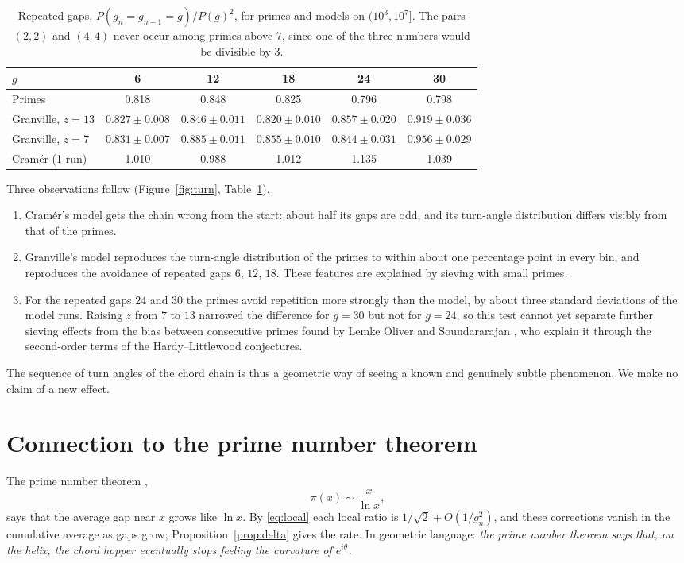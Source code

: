 \documentclass[11pt,a4paper]{article}
\theoremstyle{remark}
\theoremstyle{definition}
\begin{document}
\begin{table}[ht]
\centering
\small\setlength{\tabcolsep}{4pt}
\begin{tabular}{lccccc}
\toprule
$g$ & 6 & 12 & 18 & 24 & 30\\
\midrule
Primes & 0.818 & 0.848 & 0.825 & 0.796 & 0.798\\
Granville, $z=13$ & $0.827\pm0.008$ & $0.846\pm0.011$ & $0.820\pm0.010$ & $0.857\pm0.020$ & $0.919\pm0.036$\\
Granville, $z=7$ & $0.831\pm0.007$ & $0.885\pm0.011$ & $0.855\pm0.010$ & $0.844\pm0.031$ & $0.956\pm0.029$\\
Cram\'er (1 run) & 1.010 & 0.988 & 1.012 & 1.135 & 1.039\\
\bottomrule
\end{tabular}
\caption{Repeated gaps, $P(g_n=g_{n+1}=g)/P(g)^2$, for primes and models on $(10^3,10^7]$. The pairs $(2,2)$ and $(4,4)$ never occur among primes above $7$, since one of the three numbers would be divisible by $3$.}
\label{tab:repeat}
\end{table}

Three observations follow (Figure~\ref{fig:turn}, Table~\ref{tab:repeat}).
\begin{enumerate}[nosep]
\item Cram\'er's model gets the chain wrong from the start: about half its gaps are odd, and its turn-angle distribution differs visibly from that of the primes.
\item Granville's model reproduces the turn-angle distribution of the primes to within about one percentage point in every bin, and reproduces the avoidance of repeated gaps $6$, $12$, $18$. These features are explained by sieving with small primes.
\item For the repeated gaps $24$ and $30$ the primes avoid repetition more strongly than the model, by about three standard deviations of the model runs. Raising $z$ from $7$ to $13$ narrowed the difference for $g=30$ but not for $g=24$, so this test cannot yet separate further sieving effects from the bias between consecutive primes found by Lemke Oliver and Soundararajan \cite{los}, who explain it through the second-order terms of the Hardy--Littlewood conjectures.
\end{enumerate}
The sequence of turn angles of the chord chain is thus a geometric way of seeing a known and genuinely subtle phenomenon. We make no claim of a new effect.

\section{Connection to the prime number theorem}
The prime number theorem \cite{hadamard,vallee},
\begin{equation}
\pi(x)\sim\frac{x}{\ln x},
\end{equation}
says that the average gap near $x$ grows like $\ln x$. By \eqref{eq:local} each local ratio is $1/\sqrt2+O(1/g_n^2)$, and these corrections vanish in the cumulative average as gaps grow; Proposition~\ref{prop:delta} gives the rate. In geometric language: \emph{the prime number theorem says that, on the helix, the chord hopper eventually stops feeling the curvature of $e^{i\theta}$.}
\end{document}

